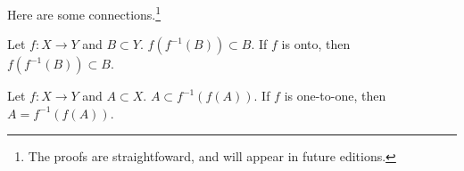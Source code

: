 Here are some connections.\footnote{The proofs are straightfoward, and will appear in future editions.}

\begin{proposition}
  Let $f: X \to Y$ and $B \subset Y$.
  $f(f^{-1}(B)) \subset B$. If $f$ is onto, then $f(f^{-1}(B)) \subset B$.
\end{proposition}
\begin{proposition}
  Let $f: X \to Y$ and $A \subset X$.
  $A \subset f^{-1}(f(A))$.
  If $f$ is one-to-one, then $A = f^{-1}(f(A))$.
\end{proposition}
